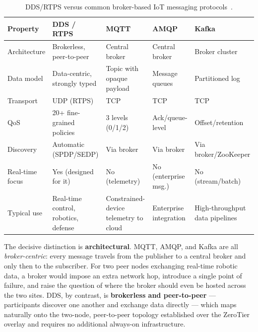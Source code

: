 \begin{table}[htbp]
    \centering
    \small
    \caption{DDS/RTPS versus common broker-based IoT messaging protocols~\cite{omg_dds14,oasis_mqtt5,oasis_amqp10,kreps2011kafka,profanter2019protocols}.}
    \label{tab:protocol_comparison}
    \begin{tabular}{p{} p{} p{} p{} p{}}
        \toprule
        \textbf{Property} & \textbf{DDS / RTPS} & \textbf{MQTT} & \textbf{AMQP} & \textbf{Kafka} \\
        \midrule
        Architecture & Brokerless, peer-to-peer & Central broker & Central broker & Broker cluster \\
        \addlinespace
        Data model & Data-centric, strongly typed & Topic with opaque payload & Message queues & Partitioned log \\
        \addlinespace
        Transport & UDP (RTPS) & TCP & TCP & TCP \\
        \addlinespace
        QoS & 20+ fine-grained policies & 3 levels (0/1/2) & Ack/queue-level & Offset/retention \\
        \addlinespace
        Discovery & Automatic (SPDP/SEDP) & Via broker & Via broker & Via broker/ZooKeeper \\
        \addlinespace
        Real-time focus & Yes (designed for it) & No (telemetry) & No (enterprise msg.) & No (stream/batch) \\
        \addlinespace
        Typical use & Real-time control, robotics, defense & Constrained-device telemetry to cloud & Enterprise integration & High-throughput data pipelines \\
        \bottomrule
    \end{tabular}
\end{table}

The decisive distinction is \textbf{architectural}. MQTT, AMQP, and Kafka are all \textit{broker-centric}: every message travels from the publisher to a central broker and only then to the subscriber. For two peer nodes exchanging real-time robotic data, a broker would impose an extra network hop, introduce a single point of failure, and raise the question of where the broker should even be hosted across the two sites. DDS, by contrast, is \textbf{brokerless and peer-to-peer} --- participants discover one another and exchange data directly --- which maps naturally onto the two-node, peer-to-peer topology established over the ZeroTier overlay and requires no additional always-on infrastructure.


